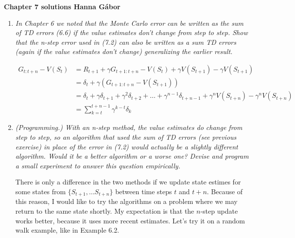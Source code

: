 \documentclass[12pt,a4paper]{article}
\begin{document}
\textbf{Chapter 7 solutions  \hfill Hanna Gábor}

\begin{enumerate}
  \item
    \textit{In Chapter 6 we noted that the Monte Carlo error can be written as the
    sum of TD errors (6.6) if the value estimates don’t change from step to step. Show that
    the n-step error used in (7.2) can also be written as a sum TD errors (again if the value
    estimates don’t change) generalizing the earlier result.}

    \begin{align*}
      G_{t: t + n} - V(S_t) & = R_{t + 1} + \gamma G_{t + 1: t + n} - V(S_t) + \gamma V(S_{t + 1}) - \gamma V(S_{t + 1})\\
      & = \delta_t + \gamma(G_{t + 1: t + n} - V(S_{t + 1})) \\
      & = \delta_t + \gamma \delta_{t + 1} + \gamma^2 \delta_{t + 2} + \dots + \gamma^{n - 1} \delta_{t + n - 1} + \gamma^{n}V(S_{t + n}) - \gamma^n V(S_{t + n}) \\
      & = \sum\limits_{k = t}^{t + n - 1} \gamma^{k - t} \delta_k
    \end{align*}

  \item
    \textit{(Programming.) With an n-step method, the value estimates do change from
    step to step, so an algorithm that used the sum of TD errors (see previous exercise) in
    place of the error in (7.2) would actually be a slightly different algorithm. Would it be a
    better algorithm or a worse one? Devise and program a small experiment to answer this
    question empirically.}

    There is only a difference in the two methods if we update state estimes for some states from
    $\{S_{t + 1}, \dots S_{t + n}\}$ between time steps $t$ and $t + n$. Because of this reason,
    I would like to try the algorithms on a problem where we may return to the same
    state shortly. My expectation is that the $n$-step update works better, because it uses
    more recent estimates. Let's try it on a random walk example, like in Example 6.2.
    

\end{enumerate}
\end{document}
